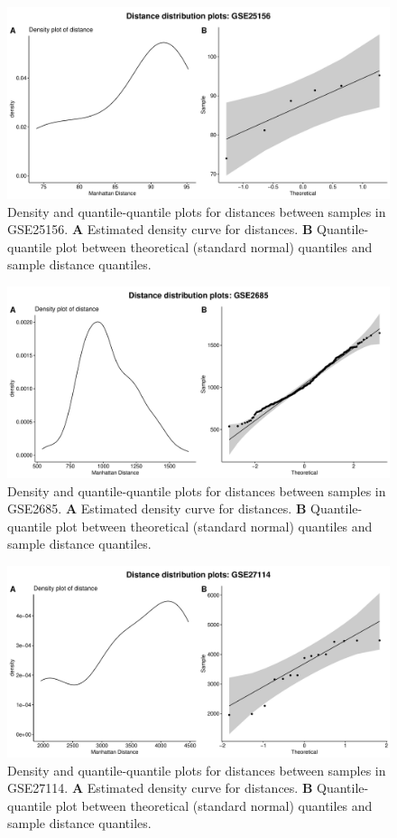 \documentclass[10pt,letterpaper]{article}\usepackage[]{graphicx}\usepackage[]{color}
\begin{document}
\begin{figure}[H]
	\includegraphics[width=\textwidth]{manhattan-distance_hist_GSE25156.pdf}
	\caption{Density and quantile-quantile plots for distances between samples in GSE25156. \textbf{A} Estimated density curve for distances. \textbf{B} Quantile-quantile plot between theoretical (standard normal) quantiles and sample distance quantiles.}
\end{figure}

\begin{figure}[H]
	\includegraphics[width=\textwidth]{manhattan-distance_hist_GSE2685.pdf}
	\caption{Density and quantile-quantile plots for distances between samples in GSE2685. \textbf{A} Estimated density curve for distances. \textbf{B} Quantile-quantile plot between theoretical (standard normal) quantiles and sample distance quantiles.}
\end{figure}

\begin{figure}[H]
	\includegraphics[width=\textwidth]{manhattan-distance_hist_GSE27114.pdf}
	\caption{Density and quantile-quantile plots for distances between samples in GSE27114. \textbf{A} Estimated density curve for distances. \textbf{B} Quantile-quantile plot between theoretical (standard normal) quantiles and sample distance quantiles.}
\end{figure}
\end{document}
